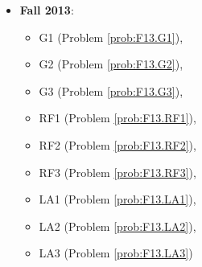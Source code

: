 \documentclass{article}
\theoremstyle{definition}
\begin{document}
\begin{itemize}
\item \textbf{Fall 2013}:  
	\begin{itemize}
	\item G1 (Problem \ref{prob:F13.G1}), 
	\item G2 (Problem \ref{prob:F13.G2}), 
	\item G3 (Problem \ref{prob:F13.G3}),
	\item RF1 (Problem \ref{prob:F13.RF1}),
	\item RF2 (Problem \ref{prob:F13.RF2}),
	\item RF3 (Problem \ref{prob:F13.RF3}),
	\item LA1 (Problem \ref{prob:F13.LA1}),
	\item LA2 (Problem \ref{prob:F13.LA2}),
	\item LA3 (Problem \ref{prob:F13.LA3})	
	\end{itemize}	
\end{itemize}














\end{document}
